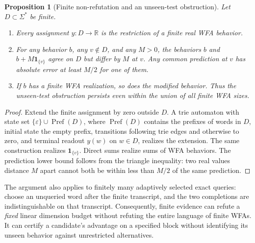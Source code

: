 \documentclass[11pt]{article}
\newtheorem{proposition}[theorem]{Proposition}
\theoremstyle{definition}
\begin{document}
\begin{proposition}[Finite non-refutation and an unseen-test obstruction]
\label{lr:finite-obstruction}
Let $D\subset\Sigma^*$ be finite.
\begin{enumerate}
\item Every assignment $y:D\to\mathbb R$ is the restriction of a
      finite real WFA behavior.
\item For any behavior $b$, any $v\notin D$, and any $M>0$, the
      behaviors $b$ and $b+M\mathbf1_{\{v\}}$ agree on $D$ but differ
      by $M$ at $v$. Any common prediction at $v$ has absolute error at
      least $M/2$ for one of them.
\item If $b$ has a finite WFA realization, so does the modified behavior.
      Thus the unseen-test obstruction persists even within the union
      of all finite WFA sizes.
\end{enumerate}
\end{proposition}
\begin{proof}
Extend the finite assignment by zero outside $D$. A trie automaton with
state set $\{\varepsilon\}\cup\operatorname{Pref}(D)$, where
$\operatorname{Pref}(D)$ contains the prefixes of words in $D$, initial state the empty
prefix, transitions following trie edges and otherwise to zero, and
terminal readout $y(w)$ on $w\in D$, realizes the extension. The same
construction realizes $\mathbf1_{\{v\}}$. Direct sums realize sums of
WFA behaviors. The prediction lower bound follows from the triangle
inequality: two real values distance $M$ apart cannot both be within
less than $M/2$ of the same prediction.
\end{proof}

The argument also applies to finitely many adaptively selected exact
queries: choose an unqueried word after the finite transcript, and the
two completions are indistinguishable on that transcript. Consequently,
finite evidence can refute a \emph{fixed} linear dimension budget without
refuting the entire language of finite WFAs. It can certify a candidate's
advantage on a specified block without identifying its unseen behavior
against unrestricted alternatives.
\end{document}
